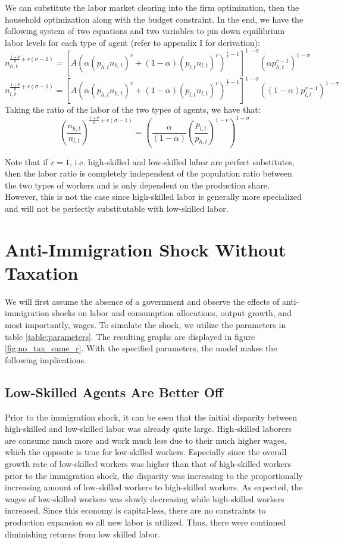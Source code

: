 \documentclass[11pt]{article}
\begin{document}
  We can substitute the labor market clearing into the firm optimization, then the household optimization along with the budget constraint. In the end, we have the following system of two equations and two variables to pin down equilibrium labor levels for each type of agent (refer to appendix I for derivation):
  $$ n_{h,t}^{\frac{1+\theta}{\theta}+r(\sigma-1)} = [A(\alpha (p_{h,t} n_{h,t})^r + (1-\alpha) (p_{l,t} n_{l,t})^r )^{\frac{1}{r}-1}]^{1-\sigma} (\alpha p_{h,t}^{r-1})^{1-\sigma}$$
  $$ n_{l,t}^{\frac{1+\theta}{\theta}+r(\sigma-1)} = [A(\alpha (p_{h,t} n_{h,t})^r + (1-\alpha) (p_{l,t} n_{l,t})^r )^{\frac{1}{r}-1}]^{1-\sigma} ((1-\alpha) p_{l,t}^{r-1})^{1-\sigma}$$
  Taking the ratio of the labor of the two types of agents, we have that:
  $$\left(\frac{n_{h,t}}{n_{l,t}}\right)^{\frac{1+\theta}{\theta}+r(\sigma-1)}=\left(\frac{\alpha}{(1-\alpha)}\left(\frac{p_{l,t}}{p_{h,t}}\right)^{1-r}\right)^{1-\sigma}$$

  Note that if $r=1$, i.e. high-skilled and low-skilled labor are perfect substitutes, then the labor ratio is completely independent of the population ratio between the two types of workers and is only dependent on the production share. However, this is not the case since high-skilled labor is generally more specialized and will not be perfectly substitutable with low-skilled labor.

\section{Anti-Immigration Shock Without Taxation}
We will first assume the absence of a government and observe the effects of anti-immigration shocks on labor and consumption allocations, output growth, and most importantly, wages. To simulate the shock, we utilize the parameters in table \ref{table:parameters}. The resulting graphs are displayed in figure \ref{fig:no_tax_same_r}. With the specified parameters, the model makes the following implications.

\subsection{Low-Skilled Agents Are Better Off}
Prior to the immigration shock, it can be seen that the initial disparity between high-skilled and low-skilled labor was already quite large. High-skilled laborers are consume much more and work much less due to their much higher wages, which the opposite is true for low-skilled workers. Especially since the overall growth rate of low-skilled workers was higher than that of high-skilled workers prior to the immigration shock, the disparity was increasing to the proportionally increasing amount of low-skilled workers to high-skilled workers. As expected, the wages of low-skilled workers was slowly decreasing while high-skilled workers increased. Since this economy is capital-less, there are no constraints to production expansion so all new labor is utilized. Thus, there were continued diminishing returns from low skilled labor.
\end{document}
